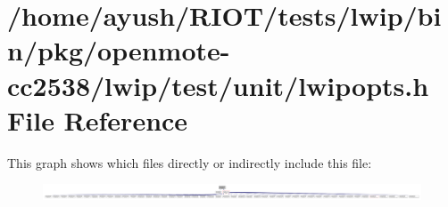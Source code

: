\hypertarget{openmote-cc2538_2lwip_2test_2unit_2lwipopts_8h}{}\section{/home/ayush/\+R\+I\+O\+T/tests/lwip/bin/pkg/openmote-\/cc2538/lwip/test/unit/lwipopts.h File Reference}
\label{openmote-cc2538_2lwip_2test_2unit_2lwipopts_8h}
This graph shows which files directly or indirectly include this file\+:
\nopagebreak
\begin{figure}[H]
\begin{center}
\leavevmode
\includegraphics[width=350pt]{openmote-cc2538_2lwip_2test_2unit_2lwipopts_8h__dep__incl}
\end{center}
\end{figure}
